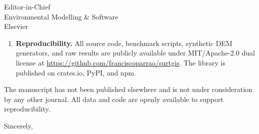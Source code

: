 \documentclass[11pt]{letter}
\begin{document}
\begin{letter}{Editor-in-Chief\\
Environmental Modelling \& Software\\
Elsevier}
\begin{enumerate}
    \item \textbf{Reproducibility.} All source code, benchmark scripts, synthetic DEM generators, and raw results are publicly available under MIT/Apache-2.0 dual license at \url{https://github.com/franciscoparrao/surtgis}. The library is published on crates.io, PyPI, and npm.
\end{enumerate}

The manuscript has not been published elsewhere and is not under consideration by any other journal. All data and code are openly available to support reproducibility.

\closing{Sincerely,}

\end{letter}
\end{document}
